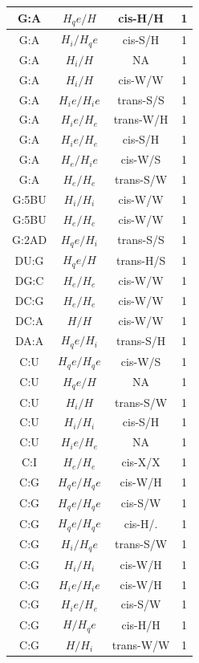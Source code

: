 \begin{center}
\begin{longtable}{c|c|c|c}
G:A & $H_qe/H$ & cis-H/H & 1 \\  \hline
G:A & $H_i/H_qe$ & cis-S/H & 1 \\  \hline
G:A & $H_i/H$ & NA & 1 \\  \hline
G:A & $H_i/H$ & cis-W/W & 1 \\  \hline
G:A & $H_ie/H_ie$ & trans-S/S & 1 \\  \hline
G:A & $H_ie/H_e$ & trans-W/H & 1 \\  \hline
G:A & $H_ie/H_e$ & cis-S/H & 1 \\  \hline
G:A & $H_e/H_ie$ & cis-W/S & 1 \\  \hline
G:A & $H_e/H_e$ & trans-S/W & 1 \\  \hline
G:5BU & $H_i/H_i$ & cis-W/W & 1 \\  \hline
G:5BU & $H_e/H_e$ & cis-W/W & 1 \\  \hline
G:2AD & $H_qe/H_i$ & trans-S/S & 1 \\  \hline
DU:G & $H_qe/H$ & trans-H/S & 1 \\  \hline
DG:C & $H_e/H_e$ & cis-W/W & 1 \\  \hline
DC:G & $H_e/H_e$ & cis-W/W & 1 \\  \hline
DC:A & $H/H$ & cis-W/W & 1 \\  \hline
DA:A & $H_qe/H_i$ & trans-S/H & 1 \\  \hline
C:U & $H_qe/H_qe$ & cis-W/S & 1 \\  \hline
C:U & $H_qe/H$ & NA & 1 \\  \hline
C:U & $H_i/H$ & trans-S/W & 1 \\  \hline
C:U & $H_i/H_i$ & cis-S/H & 1 \\  \hline
C:U & $H_ie/H_e$ & NA & 1 \\  \hline
C:I & $H_e/H_e$ & cis-X/X & 1 \\  \hline
C:G & $H_qe/H_qe$ & cis-W/H & 1 \\  \hline
C:G & $H_qe/H_qe$ & cis-S/W & 1 \\  \hline
C:G & $H_qe/H_qe$ & cis-H/. & 1 \\  \hline
C:G & $H_i/H_qe$ & trans-S/W & 1 \\  \hline
C:G & $H_i/H_i$ & cis-W/H & 1 \\  \hline
C:G & $H_ie/H_ie$ & cis-W/H & 1 \\  \hline
C:G & $H_ie/H_e$ & cis-S/W & 1 \\  \hline
C:G & $H/H_qe$ & cis-H/H & 1 \\  \hline
C:G & $H/H_i$ & trans-W/W & 1 \\  \hline

\end{longtable}
\end{center}
